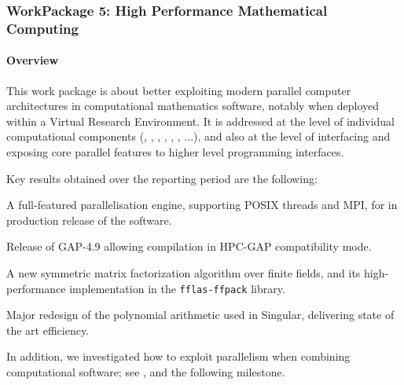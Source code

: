 \subsubsection{WorkPackage 5: High Performance Mathematical Computing}
  \label{hpc}


  \paragraph{Overview}

  This work package is about better exploiting modern parallel
  computer architectures in computational mathematics software,
  notably when deployed within a Virtual Research Environment. It is
  addressed at the level of individual computational components
  (\Pari, \GAP, \Linbox, \MPIR, \Sage, \Singular, ...), and also at
  the level of interfacing and exposing core parallel features to
  higher level programming interfaces.

  Key results obtained over the reporting period are the following:
  \begin{compactitem}
  \item {}
  \item A full-featured parallelisation engine, supporting POSIX threads and
    MPI, for \PariGP in production release of the software.
  \item Release of GAP-4.9 allowing compilation  in HPC-GAP compatibility mode.
  \item A new symmetric matrix factorization algorithm over finite fields, and
    its high-performance implementation in the \texttt{fflas-ffpack} library.
  \item Major redesign of the polynomial arithmetic used in Singular,
    delivering state of the art efficiency.
  \end{compactitem}
  In addition, we investigated how to exploit parallelism when
  combining computational software; see
  , and
  the following milestone.

